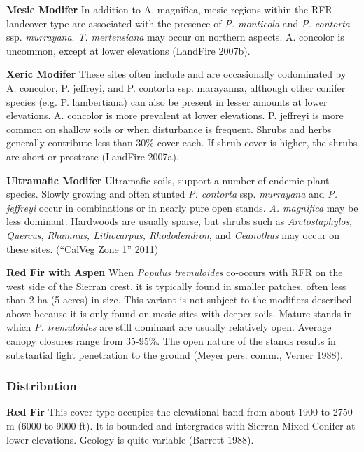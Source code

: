\begin{adjustwidth}{2cm}{}
\textbf{Mesic Modifer } In addition to A. magnifica, mesic regions within the RFR landcover type are associated with the presence of \emph{P. monticola} and \emph{P. contorta} ssp. \emph{murrayana}. \emph{T. mertensiana} may occur on northern aspects. A. concolor is uncommon, except at lower elevations (LandFire 2007b).

\textbf{Xeric Modifer}  These sites often include and are occasionally codominated by A. concolor, P. jeffreyi, and P. contorta ssp. marayanna, although other conifer species (e.g. P. lambertiana) can also be present in lesser amounts at lower elevations. A. concolor is more prevalent at lower elevations. P. jeffreyi is more common on shallow soils or when disturbance is frequent. Shrubs and herbs generally contribute less than 30\% cover each. If shrub cover is higher, the shrubs are short or prostrate (LandFire 2007a).

\textbf{Ultramafic Modifer} Ultramafic soils, support a number of endemic plant species. Slowly growing and often stunted \emph{P. contorta} ssp. \emph{murrayana} and \emph{P. jeffreyi} occur in combinations or in nearly pure open stands. \emph{A. magnifica} may be less dominant. Hardwoods are usually sparse, but shrubs such as \emph{Arctostaphylos}, \emph{Quercus}, \emph{Rhamnus, Lithocarpus, Rhododendron}, and \emph{Ceanothus} may occur on these sites. (``CalVeg Zone 1'' 2011)

\end{adjustwidth}

\textbf{Red Fir with Aspen} When \emph{Populus tremuloides} co-occurs with RFR on the west side of the Sierran crest, it is typically found in smaller patches, often less than 2 ha (5 acres) in size. This variant is not subject to the modifiers described above because it is only found on mesic sites with deeper soils. Mature stands in which \emph{P. tremuloides} are still dominant are usually relatively open. Average canopy closures range from 35-95\%. The open nature of the stands results in substantial light penetration to the ground (Meyer pers. comm., Verner 1988).



\subsubsection{Distribution}

\textbf{Red Fir} This cover type occupies the elevational band from about 1900 to 2750 m (6000 to 9000 ft). It is bounded and intergrades with Sierran Mixed Conifer at lower elevations. Geology is quite variable (Barrett 1988).

